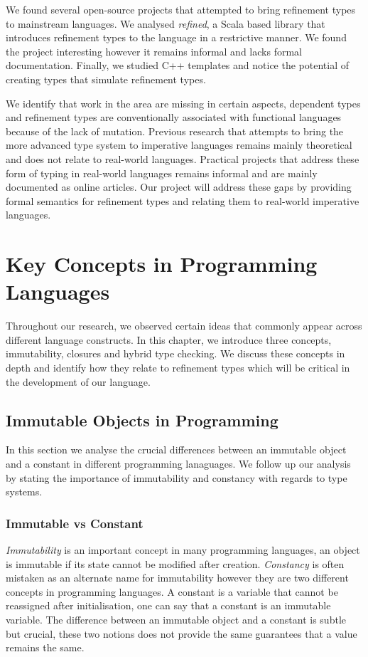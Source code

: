\documentclass[a4paper,12pt]{report}
\begin{document}
\par
We found several open-source projects that attempted to bring refinement 
types to mainstream languages. We analysed \textit{refined}, a Scala based library that 
introduces refinement types to the language in a restrictive manner. We found the 
project interesting however it remains informal and lacks formal documentation. 
Finally, we studied C++ templates and notice the potential of creating  
types that simulate refinement types.

\par
We identify that work in the area are missing in certain aspects, dependent types 
and refinement types are conventionally associated with functional languages 
because of the lack of mutation. Previous research that attempts to bring the more 
advanced type system to imperative languages remains mainly theoretical and 
does not relate to real-world languages. Practical projects that address 
these form of typing in real-world languages remains informal and are 
mainly documented as online articles. Our project will address these gaps by 
providing formal semantics for refinement types and relating them to 
real-world imperative languages. 

\chapter{Key Concepts in Programming Languages} \label{chapter:key_concepts}
Throughout our research, we observed certain ideas that commonly appear across 
different language constructs. In this chapter, we introduce three concepts, 
immutability, closures and hybrid type checking. We discuss these concepts 
in depth and identify how they relate to refinement types which will 
be critical in the development of our language.

\section{Immutable Objects in Programming}
In this section we analyse the crucial differences between an immutable object   
and a constant in different programming lanaguages. We follow up our analysis by 
stating the importance of immutability and constancy with regards to type 
systems.

\subsection{Immutable vs Constant} \label{section:const_immutable}
\emph{Immutability} is an important concept in many programming languages, an 
object is immutable if its state cannot be modified after creation. 
\emph{Constancy} is often mistaken as an alternate name for 
immutability however they are two different concepts in programming languages. 
A constant is a variable that cannot be reassigned after initialisation, one can say 
that a constant is an immutable variable. 
The difference between an immutable object and a constant is subtle but crucial, 
these two notions does not provide the same guarantees that a value remains the 
same.
 
\end{document}
